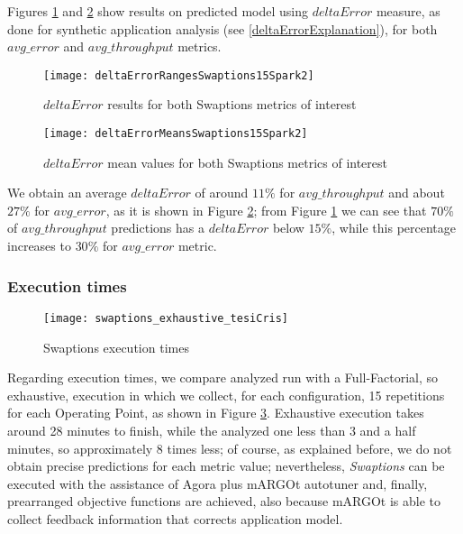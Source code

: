 Figures \ref{fig::swaptions15spark2::intervals} and \ref{fig::swaptions15spark2::means} show results on predicted model using $deltaError$ measure, as done for synthetic application analysis (see \ref{deltaErrorExplanation}), for both $avg\_error$ and $avg\_throughput$ metrics.





\begin{figure}[htb]

    \centering
    \texttt{[image: deltaErrorRangesSwaptions15Spark2]}
    \caption{$deltaError$ results for both Swaptions metrics of interest}
    \label{fig::swaptions15spark2::intervals}
    
\end{figure}

\begin{figure}[htb]

    \centering
    \texttt{[image: deltaErrorMeansSwaptions15Spark2]}
    \caption{$deltaError$ mean values for both Swaptions metrics of interest}
    \label{fig::swaptions15spark2::means}
    
\end{figure}





We obtain an average $deltaError$ of around $11\%$ for $avg\_throughput$ and about $27\%$ for $avg\_error$, as it is shown in Figure \ref{fig::swaptions15spark2::means}; from Figure \ref{fig::swaptions15spark2::intervals} we can see that $70\%$ of $avg\_throughput$ predictions has a $deltaError$ below $15\%$, while this percentage increases to $30\%$ for $avg\_error$ metric.


\subsubsection{Execution times}

\begin{figure}[htb]

    \centering
    
    \texttt{[image: swaptions\_exhaustive\_tesiCris]}
    
    \caption{Swaptions execution times}
    
    \label{fig::sw::execT}
    
\end{figure}

Regarding execution times, we compare analyzed run with a Full-Factorial, so exhaustive, execution in which we collect, for each configuration, 15 repetitions for each Operating Point, as shown in Figure \ref{fig::sw::execT}. Exhaustive execution takes around 28 minutes to finish, while the analyzed one less than 3 and a half minutes, so approximately 8 times less; of course, as explained before, we do not obtain precise predictions for each metric value; nevertheless, \textit{Swaptions} can be executed with the assistance of Agora plus mARGOt autotuner and, finally, prearranged objective functions are achieved, also because mARGOt is able to collect feedback information that corrects application model.


